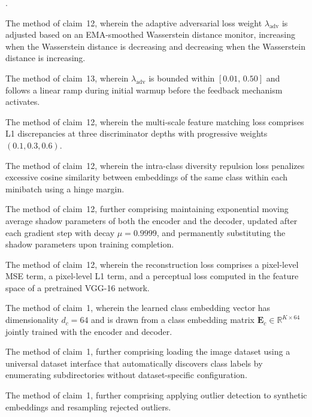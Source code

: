 \documentclass[12pt,letterpaper]{article}
\newcommand{\RR}{\mathbb{R}}
\newcounter{claimnum}
\newenvironment{claims}{%
  \setcounter{claimnum}{0}
  \begin{list}{\arabic{claimnum}.}{%
    \usecounter{claimnum}
    \setlength{\leftmargin}{2em}
    \setlength{\labelsep}{0.5em}
    \setlength{\itemsep}{0pt}
    \setlength{\parsep}{6pt plus 2pt}
  }%
}{\end{list}}
\begin{document}
\begin{claims}
\item The method of claim~12, wherein the adaptive adversarial loss weight
$\lambda_{\text{adv}}$ is adjusted based on an EMA-smoothed Wasserstein
distance monitor, increasing when the Wasserstein distance is decreasing and
decreasing when the Wasserstein distance is increasing.

\item The method of claim~13, wherein $\lambda_{\text{adv}}$ is bounded
within $[0.01,\, 0.50]$ and follows a linear ramp during initial warmup
before the feedback mechanism activates.

\item The method of claim~12, wherein the multi-scale feature matching loss
comprises L1 discrepancies at three discriminator depths with progressive
weights $(0.1, 0.3, 0.6)$.

\item The method of claim~12, wherein the intra-class diversity repulsion
loss penalizes excessive cosine similarity between embeddings of the same
class within each minibatch using a hinge margin.

\item The method of claim~12, further comprising maintaining exponential
moving average shadow parameters of both the encoder and the decoder,
updated after each gradient step with decay $\mu = 0.9999$, and permanently
substituting the shadow parameters upon training completion.

\item The method of claim~12, wherein the reconstruction loss comprises a
pixel-level MSE term, a pixel-level L1 term, and a perceptual loss computed
in the feature space of a pretrained VGG-16 network.

\item The method of claim~1, wherein the learned class embedding vector has
dimensionality $d_c = 64$ and is drawn from a class embedding matrix
$\mathbf{E}_c \in \RR^{K \times 64}$ jointly trained with the encoder and
decoder.

\item The method of claim~1, further comprising loading the image dataset
using a universal dataset interface that automatically discovers class labels
by enumerating subdirectories without dataset-specific configuration.

\item The method of claim~1, further comprising applying outlier detection
to synthetic embeddings and resampling rejected outliers.


\end{claims}
\end{document}
